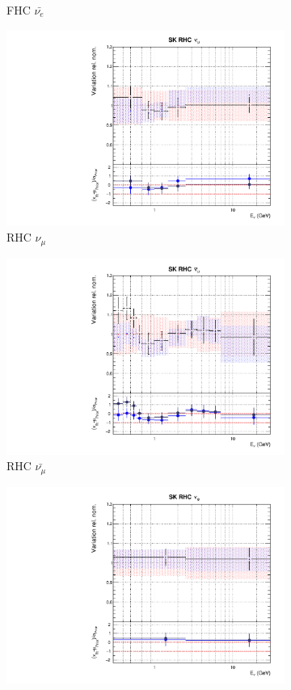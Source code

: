 \begin{figure}[t]
\begin{subfigure}{0.42\textwidth}
  \caption{\SK FHC $\bar{\nu_{e}}$}
\end{subfigure}
\begin{subfigure}{0.42\textwidth}
  \centering
  \includegraphics[width=0.75\linewidth]{figs/rhcmpdat28flux_12}
  \caption{\SK RHC $\nu_{\mu}$}
\end{subfigure}
\begin{subfigure}{0.42\textwidth}
  \centering
  \includegraphics[width=0.75\linewidth]{figs/rhcmpdat28flux_13}
  \caption{\SK RHC $\bar{\nu_{\mu}}$}
\end{subfigure}
\begin{subfigure}{0.42\textwidth}
  \centering
  \includegraphics[width=0.75\linewidth]{figs/rhcmpdat28flux_14}

\end{subfigure}
\end{figure}
